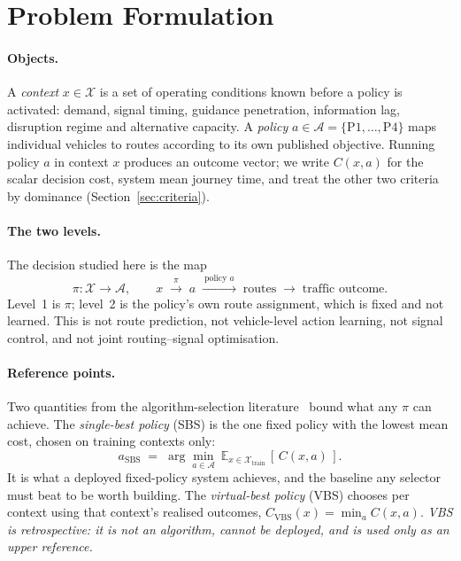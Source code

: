 \section{Problem Formulation}

\paragraph{Objects.}
A \emph{context} $x \in \mathcal{X}$ is a set of operating conditions known
before a policy is activated: demand, signal timing, guidance penetration,
information lag, disruption regime and alternative capacity. A \emph{policy}
$a \in \mathcal{A} = \{\mathrm{P1},\dots,\mathrm{P4}\}$ maps individual vehicles
to routes according to its own published objective. Running policy $a$ in
context $x$ produces an outcome vector; we write $C(x,a)$ for the scalar
decision cost, system mean journey time, and treat the other two criteria by
dominance (Section~\ref{sec:criteria}).

\paragraph{The two levels.}
The decision studied here is the map
\begin{equation}
\pi : \mathcal{X} \to \mathcal{A},
\qquad
x \;\xrightarrow{\ \pi\ }\; a \;\xrightarrow{\ \text{policy } a\ }\;
\text{routes} \;\longrightarrow\; \text{traffic outcome}.
\end{equation}
Level~1 is $\pi$; level~2 is the policy's own route assignment, which is fixed
and not learned. This is not route prediction, not vehicle-level action
learning, not signal control, and not joint routing--signal optimisation.

\paragraph{Reference points.}
Two quantities from the algorithm-selection literature~\cite{bischl2016aslib}
bound what any $\pi$ can achieve. The \emph{single-best policy} (SBS) is the one
fixed policy with the lowest mean cost, chosen on training contexts only:
\begin{equation}
a_{\mathrm{SBS}} \;=\; \arg\min_{a \in \mathcal{A}}\
\mathbb{E}_{x \in \mathcal{X}_{\mathrm{train}}}\,[\,C(x,a)\,].
\end{equation}
It is what a deployed fixed-policy system achieves, and the baseline any
selector must beat to be worth building. The \emph{virtual-best policy} (VBS)
chooses per context using that context's realised outcomes,
$C_{\mathrm{VBS}}(x) = \min_{a} C(x,a)$. \emph{VBS is retrospective: it is not
an algorithm, cannot be deployed, and is used only as an upper reference.}


